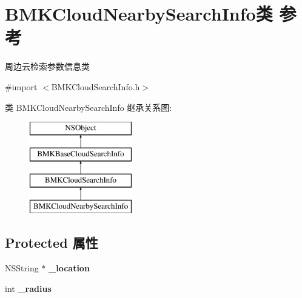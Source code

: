 \hypertarget{interface_b_m_k_cloud_nearby_search_info}{}\section{B\+M\+K\+Cloud\+Nearby\+Search\+Info类 参考}
\label{interface_b_m_k_cloud_nearby_search_info}


周边云检索参数信息类  




{\ttfamily \#import $<$B\+M\+K\+Cloud\+Search\+Info.\+h$>$}

类 B\+M\+K\+Cloud\+Nearby\+Search\+Info 继承关系图\+:\begin{figure}[H]
\begin{center}
\leavevmode
\includegraphics[height=4.000000cm]{interface_b_m_k_cloud_nearby_search_info}
\end{center}
\end{figure}
\subsection*{Protected 属性}
\begin{DoxyCompactItemize}
\item 
\hypertarget{interface_b_m_k_cloud_nearby_search_info_a6a4cfe0d1809afeaa9f9fd78bb29ded3}{}N\+S\+String $\ast$ {\bfseries \+\_\+location}\label{interface_b_m_k_cloud_nearby_search_info_a6a4cfe0d1809afeaa9f9fd78bb29ded3}

\item 
\hypertarget{interface_b_m_k_cloud_nearby_search_info_a30c18210f666d7913e3f8d9c00161016}{}int {\bfseries \+\_\+radius}\label{interface_b_m_k_cloud_nearby_search_info_a30c18210f666d7913e3f8d9c00161016}

\end{DoxyCompactItemize}
